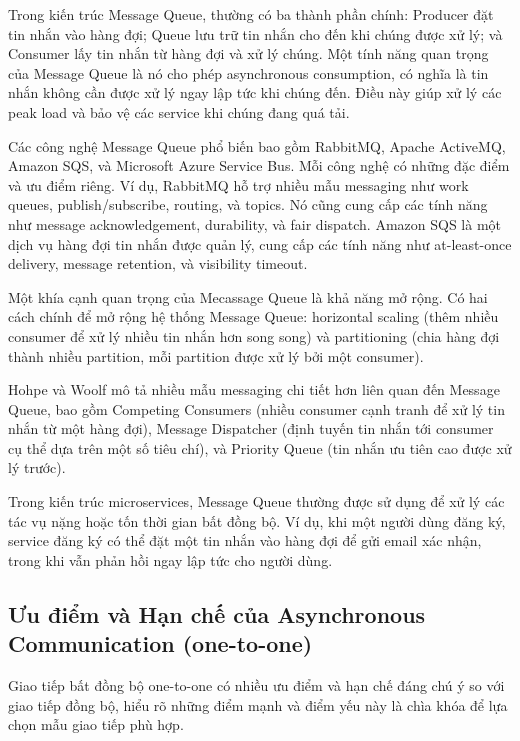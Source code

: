 Trong kiến trúc Message Queue, thường có ba thành phần chính: Producer đặt tin nhắn vào hàng đợi; Queue lưu trữ tin nhắn cho đến khi chúng được xử lý; và Consumer lấy tin nhắn từ hàng đợi và xử lý chúng. Một tính năng quan trọng của Message Queue là nó cho phép asynchronous consumption, có nghĩa là tin nhắn không cần được xử lý ngay lập tức khi chúng đến. Điều này giúp xử lý các peak load và bảo vệ các service khi chúng đang quá tải.

Các công nghệ Message Queue phổ biến bao gồm RabbitMQ, Apache ActiveMQ, Amazon SQS, và Microsoft Azure Service Bus. Mỗi công nghệ có những đặc điểm và ưu điểm riêng. Ví dụ, RabbitMQ hỗ trợ nhiều mẫu messaging như work queues, publish/subscribe, routing, và topics. Nó cũng cung cấp các tính năng như message acknowledgement, durability, và fair dispatch. Amazon SQS là một dịch vụ hàng đợi tin nhắn được quản lý, cung cấp các tính năng như at-least-once delivery, message retention, và visibility timeout.

Một khía cạnh quan trọng của Mecassage Queue là khả năng mở rộng. Có hai cách chính để mở rộng hệ thống Message Queue: horizontal scaling (thêm nhiều consumer để xử lý nhiều tin nhắn hơn song song) và partitioning (chia hàng đợi thành nhiều partition, mỗi partition được xử lý bởi một consumer).

Hohpe và Woolf \cite{hohpe2004} mô tả nhiều mẫu messaging chi tiết hơn liên quan đến Message Queue, bao gồm Competing Consumers (nhiều consumer cạnh tranh để xử lý tin nhắn từ một hàng đợi), Message Dispatcher (định tuyến tin nhắn tới consumer cụ thể dựa trên một số tiêu chí), và Priority Queue (tin nhắn ưu tiên cao được xử lý trước).

Trong kiến trúc microservices, Message Queue thường được sử dụng để xử lý các tác vụ nặng hoặc tốn thời gian bất đồng bộ. Ví dụ, khi một người dùng đăng ký, service đăng ký có thể đặt một tin nhắn vào hàng đợi để gửi email xác nhận, trong khi vẫn phản hồi ngay lập tức cho người dùng.

\subsection{Ưu điểm và Hạn chế của Asynchronous Communication (one-to-one)}
Giao tiếp bất đồng bộ one-to-one có nhiều ưu điểm và hạn chế đáng chú ý so với giao tiếp đồng bộ, hiểu rõ những điểm mạnh và điểm yếu này là chìa khóa để lựa chọn mẫu giao tiếp phù hợp.

